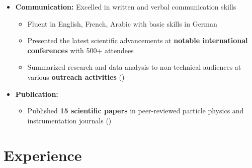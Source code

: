 \documentclass{myfancycv}
\begin{document}
{\begin{itemize}
\vspace{6pt}

\item{ \textbf{Communication:} Excelled in written and verbal communication skills
{\begin{itemize}\setlength\itemindent{-2.2em}
    \item Fluent in English, French, Arabic with basic skills in German
    \item Presented the latest scientific advancements at {\bf notable international conferences} with 500+ attendees
    \item Summarized research and data analysis to non-technical audiences at various {\bf outreach activities} (\href{http://atlas.cern/updates/physics-briefing/probing-dark-matter-higgs-boson}{})
\end{itemize}}%
}

\vspace{6pt}

\item {\textbf{Publication:}
{\begin{itemize}\setlength\itemindent{-2.2em}
    \item Published {\bf15 scientific papers} in peer-reviewed particle physics and instrumentation journals (\href{https://orcid.org/0000-0002-9169-0793}{})
\end{itemize}}%
}

\end{itemize}


\section{Experience}

\begin{itemize}


\end{itemize}}
\end{document}
